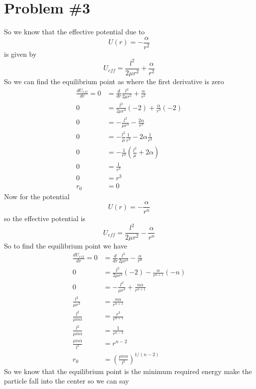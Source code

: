 \documentclass[11pt]{article}
\numberwithin{equation}{section}
\begin{document}
\section{Problem \#3}
So we know that the effective potential due to
$$U(r) = -\frac{\alpha}{r^2}$$
is given by
$$U_{eff} = \frac{l^2}{2\mu r^2} + \frac{\alpha}{r^2}$$
So we can find the equilibrium point as where the first derivative is zero
\begin{align*}
\frac{d U_{eff}}{dr} = 0 &= \frac{d}{dr}\frac{l^2}{2\mu r^2} + \frac{\alpha}{r^2}\\
0 &= \frac{l^2}{2\mu r^3}(-2) + \frac{\alpha}{r^3}(-2)\\
0 &= -\frac{l^2}{\mu r^3}  -\frac{2\alpha}{r^3}\\
0 &= -\frac{l^2}{\mu}\frac{1}{r^3}  -{2\alpha}\frac{1}{r^3}\\
0 &= -\frac{1}{r^3}\left(\frac{l^2}{\mu}  + {2\alpha}\right)\\
0 &= \frac{1}{r^3}\\
0 &= {r^3}\\
r_0 &=0
\end{align*}
Now for the potential
$$U(r) = -\frac{\alpha}{r^n}$$
so the effective potential is
$$U_{eff} = \frac{l^2}{2\mu r^2} - \frac{\alpha}{r^n}$$
So to find the equilibrium point we have
\begin{align*}
\frac{d U_{eff}}{dr} = 0 &= \frac{d}{dr}\frac{l^2}{2\mu r^2} - \frac{\alpha}{r^n}\\
0 &= \frac{l^2}{2\mu r^3}(-2) - \frac{\alpha}{r^{n+1}}(-n)\\
0 &= -\frac{l^2}{\mu r^3} + \frac{n\alpha}{r^{n+1}}\\
\frac{l^2}{\mu r^3} &= \frac{n\alpha}{r^{n+1}}\\
\frac{l^2}{\mu n\alpha} &= \frac{r^3}{r^{n+1}}\\
\frac{l^2}{\mu n\alpha} &= \frac{1}{r^{n-2}}\\
\frac{\mu n\alpha}{l^2} &= {r^{n-2}}\\
r_0&= \left(\frac{\mu n\alpha}{l^2}\right)^{1/(n-2)}
\end{align*}
So we know that the equilibrium point is the minimum required energy make the particle fall into the center so we can say
\end{document}
